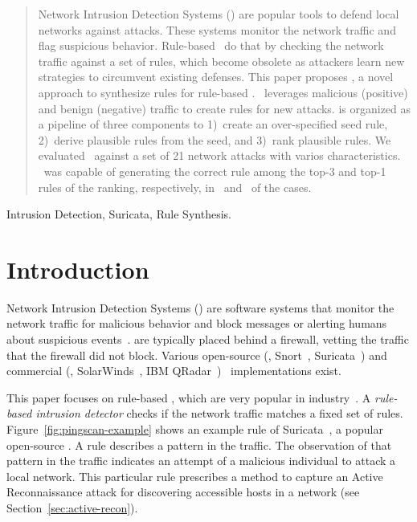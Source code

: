 \documentclass[conference]{IEEEtran}
\begin{document}
\pagestyle{plain}
\maketitle


\begin{abstract}
Network Intrusion Detection Systems (\nids{}) are popular tools to
defend local networks against attacks. These systems monitor the
network traffic and flag suspicious behavior. Rule-based \nids\ do
that by checking the network traffic against a set of rules, which
become obsolete as attackers learn new strategies to circumvent
existing defenses. This paper proposes \tname{}, a novel approach to
synthesize rules for rule-based \nids. \tname\ leverages malicious
(positive) and benign (negative) traffic to create rules for new
attacks. \tname{} is organized as a pipeline of three components to
1)~create an over-specified seed rule, 2)~derive plausible rules from
the seed, and 3)~rank plausible rules. We evaluated \tname\ against a
set of 21 network attacks with varios
characteristics. \tname\ was capable of generating the correct rule 
among the top-3 and top-1 rules of the ranking, respectively, in 
\percTopThreeRankingPrefix\ and \percTopOneRankingPrefix\ of the cases.
\end{abstract}

\begin{IEEEkeywords}
Intrusion Detection, Suricata, Rule Synthesis.
\end{IEEEkeywords}

\section{Introduction}
\label{sec:intro}

Network Intrusion Detection Systems (\nids{}) are software systems
that monitor the network traffic for malicious behavior and block 
messages or alerting humans about suspicious
events~\cite{Mitchell:2014:SID:2597757.2542049}. \nids{} are typically
placed behind a firewall, vetting the traffic that the firewall did
not block. Various open-source (\eg{}, Snort~\cite{snort},
Suricata~\cite{suricata}) and commercial (\eg{},
SolarWinds~\cite{solarwinds}, IBM QRadar~\cite{qradar})
\nids\ implementations exist.


This paper focuses on rule-based \nids{}, which are very popular in
industry~\cite{proofpoint-etpro,snort-rule-subscriptions}. A
\emph{rule-based intrusion detector} checks if the network traffic matches a fixed
set of rules. Figure~\ref{fig:pingscan-example} shows an example rule
of Suricata~\cite{suricata}, a popular open-source \nids{}. A rule
describes a pattern in the traffic. The observation of that pattern in
the traffic indicates an attempt of a malicious individual
to attack a local network. This particular rule prescribes a method to
capture an Active Reconnaissance attack for discovering accessible
hosts in a network (see Section~\ref{sec:active-recon}).
\end{document}
